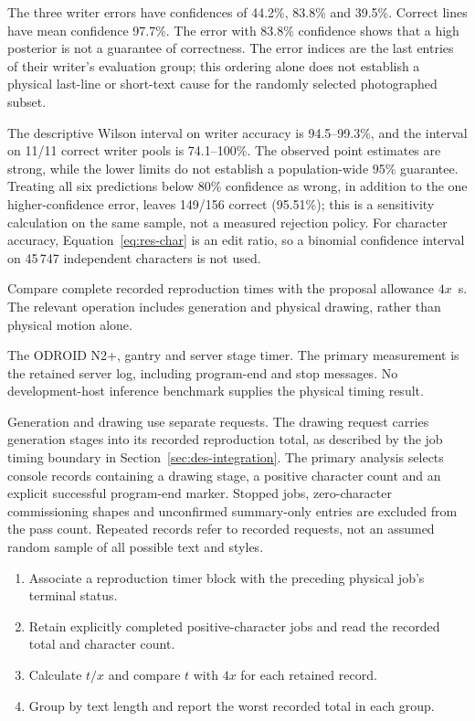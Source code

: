 The three writer errors have confidences of 44.2\%, 83.8\% and 39.5\%. Correct lines have mean confidence 97.7\%. The error with 83.8\% confidence shows that a high posterior is not a guarantee of correctness. The error indices are the last entries of their writer's evaluation group; this ordering alone does not establish a physical last-line or short-text cause for the randomly selected photographed subset.

The descriptive Wilson interval on writer accuracy is 94.5--99.3\%, and the interval on 11/11 correct writer pools is 74.1--100\%. The observed point estimates are strong, while the lower limits do not establish a population-wide 95\% guarantee. Treating all six predictions below 80\% confidence as wrong, in addition to the one higher-confidence error, leaves 149/156 correct (95.51\%); this is a sensitivity calculation on the same sample, not a measured rejection policy. For character accuracy, Equation~\ref{eq:res-char} is an edit ratio, so a binomial confidence interval on 45\,747 independent characters is not used.

Compare complete recorded reproduction times with the proposal allowance $4x$~s. The relevant operation includes generation and physical drawing, rather than physical motion alone.

The ODROID N2+, gantry and server stage timer. The primary measurement is the retained server log, including program-end and stop messages. No development-host inference benchmark supplies the physical timing result.

Generation and drawing use separate requests. The drawing request carries generation stages into its recorded reproduction total, as described by the job timing boundary in Section~\ref{sec:des-integration}. The primary analysis selects console records containing a drawing stage, a positive character count and an explicit successful program-end marker. Stopped jobs, zero-character commissioning shapes and unconfirmed summary-only entries are excluded from the pass count. Repeated records refer to recorded requests, not an assumed random sample of all possible text and styles.

\begin{enumerate}\setlength{\itemsep}{1pt}
\item Associate a reproduction timer block with the preceding physical job's terminal status.
\item Retain explicitly completed positive-character jobs and read the recorded total and character count.
\item Calculate $t/x$ and compare $t$ with $4x$ for each retained record.
\item Group by text length and report the worst recorded total in each group.
\end{enumerate}

